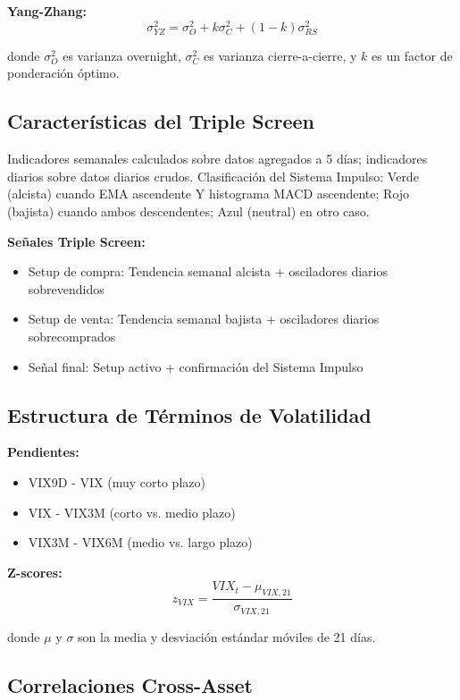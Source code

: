 \documentclass[11pt,a4paper]{article}
\begin{document}
\textbf{Yang-Zhang:}
$$\sigma_{YZ}^2 = \sigma_O^2 + k\sigma_C^2 + (1-k)\sigma_{RS}^2$$

donde $\sigma_O^2$ es varianza overnight, $\sigma_C^2$ es varianza cierre-a-cierre, y $k$ es un factor de ponderación óptimo.

\subsection{Características del Triple Screen}

Indicadores semanales calculados sobre datos agregados a 5 días; indicadores diarios sobre datos diarios crudos. Clasificación del Sistema Impulso: Verde (alcista) cuando EMA ascendente Y histograma MACD ascendente; Rojo (bajista) cuando ambos descendentes; Azul (neutral) en otro caso.

\textbf{Señales Triple Screen:}
\begin{itemize}[noitemsep]
    \item Setup de compra: Tendencia semanal alcista + osciladores diarios sobrevendidos
    \item Setup de venta: Tendencia semanal bajista + osciladores diarios sobrecomprados
    \item Señal final: Setup activo + confirmación del Sistema Impulso
\end{itemize}

\subsection{Estructura de Términos de Volatilidad}

\textbf{Pendientes:}
\begin{itemize}[noitemsep]
    \item VIX9D - VIX (muy corto plazo)
    \item VIX - VIX3M (corto vs. medio plazo)
    \item VIX3M - VIX6M (medio vs. largo plazo)
\end{itemize}

\textbf{Z-scores:}
$$z_{VIX} = \frac{VIX_t - \mu_{VIX,21}}{\sigma_{VIX,21}}$$

donde $\mu$ y $\sigma$ son la media y desviación estándar móviles de 21 días.

\subsection{Correlaciones Cross-Asset}
\end{document}
